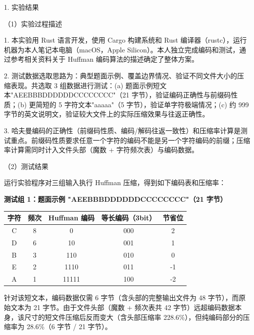 \noindent\hspace*{2em}1. 实验结果\par
\noindent\hspace*{2em}（1）实验过程描述\par
\noindent\hspace*{2em}1. 本实验用 Rust 语言开发，使用 Cargo 构建系统和 Rust 编译器（rustc），运行机器为本人笔记本电脑（macOS，Apple Silicon）。本人独立完成编码和测试，通过参考相关资料关于 Huffman 编码算法的描述确定了整体方案。\par
\noindent\hspace*{2em}2. 测试数据选取思路为：典型题面示例、覆盖边界情况、验证不同文件大小的压缩表现。共选取 3 组数据进行测试：(a) 题面示例短文本"AEEBBBDDDDDDCCCCCCCC"（21 字节），验证编码正确性与前缀码性质；(b) 更简短的 5 字符文本"aaaaa"（5 字节），验证单字符极端情况；(c) 约 999 字节的英文说明文，验证较大文件上的实际压缩效果与往返正确性。\par
\noindent\hspace*{2em}3. 哈夫曼编码的正确性（前缀码性质、编码/解码往返一致性）和压缩率计算是测试重点。前缀码性质要求任意一个字符的编码不能是另一个字符编码的前缀；压缩率计算需同时计入文件头部（魔数 + 字符频次表）与编码数据。\par
\noindent\hspace*{2em}（2）测试结果\par
\noindent\hspace*{2em}运行实验程序对三组输入执行 Huffman 压缩，得到如下编码表和压缩率：\par
\noindent\hspace*{2em}\textbf{测试组 1：题面示例 "AEEBBBDDDDDDCCCCCCCC"（21 字节）}\par
\begin{center}
\fontsize{9pt}{12pt}\selectfont
\renewcommand{\arraystretch}{1.25}
\begin{tabular}{|c|c|c|c|c|}
\hline
\textbf{字符} & \textbf{频次} & \textbf{Huffman 编码} & \textbf{等长编码（3bit）} & \textbf{节省位} \\ \hline
C & 8 & 0  & 000 & 2 \\ \hline
D & 6 & 10 & 001 & 1 \\ \hline
B & 3 & 110 & 010 & 0 \\ \hline
E & 2 & 1110 & 011 & -1 \\ \hline
A & 1 & 11111 & 100 & -2 \\ \hline
\end{tabular}
\end{center}
\noindent\hspace*{2em}针对该短文本，编码数据仅需 6 字节（含头部的完整输出文件为 48 字节），而原始文本为 21 字节。由于文件头部（魔数 + 频次表共 42 字节）远超编码数据本身，该尺寸的短文件压缩后反而变大（含头部压缩率 228.6\%），但纯编码部分的压缩率为 28.6\%（6 字节 / 21 字节）。\par
